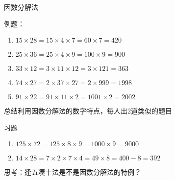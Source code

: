 \documentclass[aspectratio=169]{ctexbeamer} %
\date{\today}
\begin{document}
\begin{frame}[t]{因数分解法}
\begin{spacing}{1.2}
\normalsize
例题：
\begin{enumerate}[label={\arabic*.}]
\item $15 \times 28  = 15 \times 4 \times 7 = 60 \times 7 = 420$
\item $25 \times 36  = 25 \times 4 \times 9 = 100 \times 9 = 900$
\item $33 \times 12  = 3 \times 11 \times 12 = 3 \times 121 = 363$
\item $74 \times 27  = 2 \times 37 \times 27 = 2 \times 999 = 1998$
\item $91 \times 22  = 91 \times 11 \times 2 = 1001 \times 2 = 2002$
\end{enumerate}
\alert{总结利用因数分解法的数字特点，每人出2道类似的题目} \\
\end{spacing}
\end{frame}

\begin{frame}[t]{习题}
\begin{spacing}{1.2}
\normalsize
\begin{enumerate}[label={\arabic*.}]
\item $125 \times 72 =  125 \times 8 \times 9 = 1000 \times 9 = 9000$
\item $14 \times 28 =  7 \times 2 \times 7 \times 4 = 49 \times 8 = 400 - 8 = 392$

\end{enumerate}
\alert{思考：逢五凑十法是不是因数分解法的特例？}
\end{spacing}
\end{frame}
\end{document}
